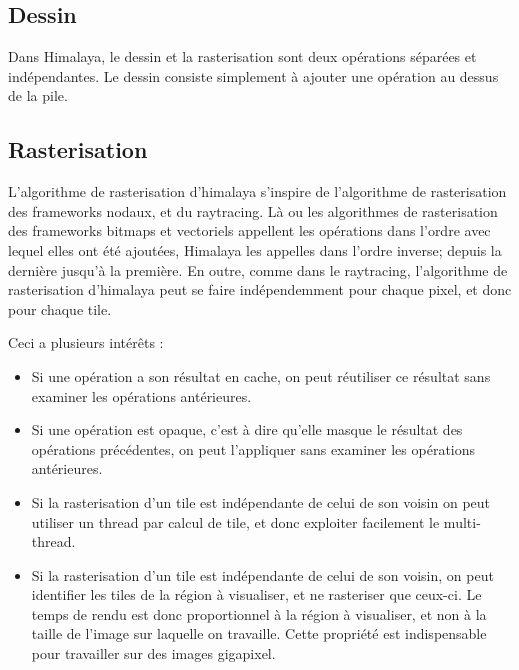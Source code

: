 		\subsection{Dessin}
		Dans Himalaya, le dessin et la rasterisation sont deux opérations séparées et indépendantes. Le dessin consiste simplement à ajouter une 
		opération au dessus de la pile.

		\subsection{Rasterisation}
		L'algorithme de rasterisation d'himalaya s'inspire de l'algorithme de rasterisation des frameworks nodaux, et du raytracing\cite{shirley}.
		Là ou les algorithmes de rasterisation des frameworks bitmaps et vectoriels appellent les opérations dans l'ordre avec lequel
		elles ont été ajoutées, Himalaya les appelles dans l'ordre inverse; depuis la dernière jusqu'à la première.  En outre, comme dans
		le raytracing, l'algorithme de rasterisation d'himalaya peut se faire indépendemment pour chaque pixel, et donc pour chaque tile. 

		Ceci a plusieurs intérêts :
		\begin{itemize}
			\item Si une opération a son résultat en cache, on peut réutiliser ce résultat sans examiner les opérations antérieures.
			\item Si une opération est opaque, c'est à dire qu'elle masque le résultat des opérations précédentes, on peut l'appliquer
			sans examiner les opérations antérieures.
			\item Si la rasterisation d'un tile est indépendante de celui de son voisin on peut utiliser un thread par calcul de tile, et donc
			exploiter facilement le multi-thread.
			\item Si la rasterisation d'un tile est indépendante de celui de son voisin, on peut identifier les tiles de la région à visualiser,
			et ne rasteriser que ceux-ci. Le temps de rendu est donc proportionnel à la région à visualiser, et non à la taille de l'image sur
			laquelle on travaille. Cette propriété est indispensable pour travailler sur des images gigapixel.
		\end{itemize}

